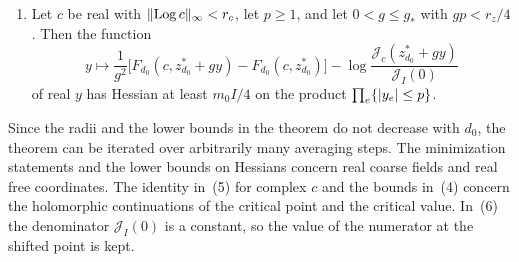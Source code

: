 \begin{theorem}
\begin{enumerate}
\[
 \frac{E_{d_0+1}(c)}{g_+^2}=\frac1{g^2}\min_{\norm z_\infty\le r_z}F_{d_0}(c,z).
\]
\item Let $c$ be real with $\lVert \operatorname{Log} c\rVert_\infty<r_c$, let $p\ge1$, and let $0<g\le g_*$ with $gp<r_z/4$. Then the function
\[
 y\longmapsto\frac1{g^2}\bigl[F_{d_0}(c,z_{d_0}^*+gy)-F_{d_0}(c,z_{d_0}^*)\bigr]-\log\frac{\mathcal J_c(z_{d_0}^*+gy)}{\mathcal J_I(0)}
\]
of real $y$ has Hessian at least $m_0I/4$ on the product $\prod_e\{\lvert y_e\rvert\le p\}$.
\end{enumerate}
\end{theorem}

Since the radii and the lower bounds in the theorem do not decrease with $d_0$, the theorem can be iterated over arbitrarily many averaging steps. The minimization statements and the lower bounds on Hessians concern real coarse fields and real free coordinates. The identity in~(5) for complex $c$ and the bounds in~(4) concern the holomorphic continuations of the critical point and the critical value. In~(6) the denominator $\mathcal J_I(0)$ is a constant, so the value of the numerator at the shifted point is kept.

